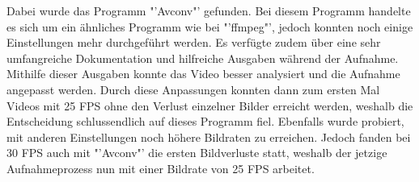 Dabei wurde das Programm "'Avconv"' gefunden. Bei diesem Programm handelte es sich um ein ähnliches Programm wie bei "'ffmpeg"', jedoch konnten noch einige Einstellungen mehr durchgeführt werden. Es verfügte zudem über eine sehr umfangreiche Dokumentation und hilfreiche Ausgaben während der Aufnahme. Mithilfe dieser Ausgaben konnte das Video besser analysiert und die Aufnahme angepasst werden. Durch diese Anpassungen konnten dann zum ersten Mal Videos mit 25 FPS ohne den Verlust einzelner Bilder erreicht werden, weshalb die Entscheidung schlussendlich auf dieses Programm fiel. Ebenfalls wurde probiert, mit anderen Einstellungen noch höhere Bildraten zu erreichen. Jedoch fanden bei 30 FPS auch mit "'Avconv"' die ersten Bildverluste statt, weshalb der jetzige Aufnahmeprozess nun mit einer Bildrate von 25 FPS arbeitet. \cite{Avconv}